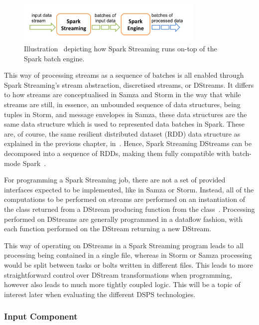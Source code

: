\begin{figure}[H]
  \centering
  \includegraphics[width=0.8\textwidth]{includes/figures/fig_spark_layout}
  \caption{Illustration~\cite{Spark_doc_fig} depicting how Spark Streaming runs on-top of the Spark batch engine.}
  \label{fig:spark_stream_batch}
\end{figure}

This way of processing streams as a sequence of batches is all enabled through Spark Streaming's stream abstraction,
discretised streams, or DStreams. It differs to how streams are conceptualised in Samza and Storm in the way that while
streams are still, in essence, an unbounded sequence of data structures, being tuples in Storm, and message envelopes in
Samza, these data structures are the same data structure which is used to represented data batches in Spark. These are,
of course, the same resilient distributed dataset (RDD) data structure as explained in the previous chapter, in~.
Hence, Spark Streaming DStreams can be decomposed into a sequence of RDDs, making them fully compatible with batch-mode Spark~\cite{spark_stream_doc}.

For programming a Spark Streaming job, there are not a set of provided interfaces expected to be implemented, like in
Samza or Storm. Instead, all of the computations to be performed on streams are performed on an instantiation of the
 class returned from a DStream producing function from the
 class~\cite{spark_stream_doc}. Processing performed on DStreams are generally programmed in
a dataflow fashion, with each function performed on the DStream returning a new DStream.

This way of operating on DStreams in a Spark Streaming program leads to all processing being contained in a single file,
whereas in Storm or Samza processing would be split between tasks or bolts written in different files. This leads to
more straightforward control over DStream transformations when programming, however also leads to much more tightly
coupled logic. This will be a topic of interest later when evaluating the different DSPS technologies.

\subsubsection{Input Component}

